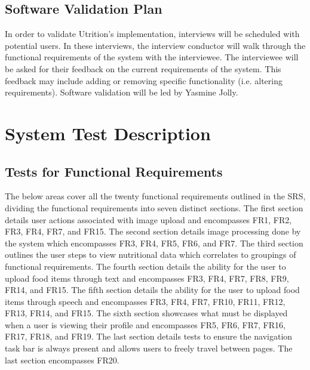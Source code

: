 \documentclass[12pt, titlepage]{article}
\begin{document}
	\subsection{Software Validation Plan}
	
	
	
	
	In order to validate Utrition's implementation, interviews will be scheduled with potential users. In these interviews, the interview conductor will walk through the functional requirements of the system with the interviewee. The interviewee will be asked for their feedback on the current requirements of the system. This feedback may include adding or removing specific functionality (i.e. altering requirements). Software validation will be led by Yasmine Jolly. 
	
	\section{System Test Description}
	
	\subsection{Tests for Functional Requirements}
	The below areas cover all the twenty functional requirements outlined in the SRS, dividing the functional requirements into seven distinct sections. The first section details user actions associated with image upload and encompasses FR1, FR2, FR3, FR4, FR7, and FR15. The second section details image processing done by the system which encompasses FR3, FR4, FR5, FR6, and FR7. The third section outlines the user steps to view nutritional data which correlates to groupings of functional requirements. The fourth section details the ability for the user to upload food items through text and encompasses FR3, FR4, FR7, FR8, FR9, FR14, and FR15. The fifth section details the ability for the user to upload food items through speech and encompasses FR3, FR4, FR7, FR10, FR11, FR12, FR13, FR14, and FR15. The sixth section showcases what must be displayed when a user is viewing their profile and encompasses FR5, FR6, FR7, FR16, FR17, FR18, and FR19. The last section details tests to ensure the navigation task bar is always present and allows users to freely travel between pages. The last section encompasses FR20.
	
\end{document}
